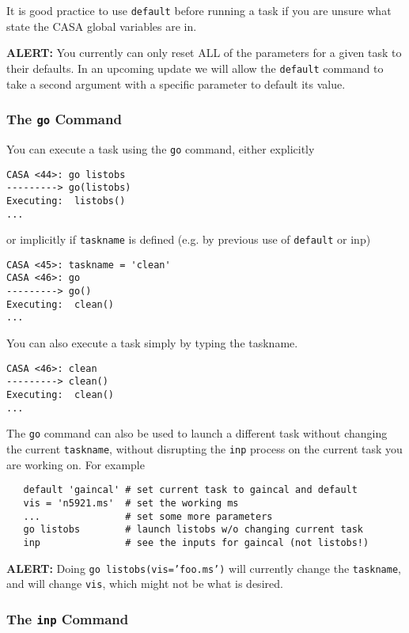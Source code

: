 It is good practice to use {\tt default} before running a task
if you are unsure what state the CASA global variables are in.

{\bf ALERT:} You currently can only reset ALL of the parameters
for a given task to their defaults.  In an upcoming update we will
allow the {\tt default} command to take a second argument with a
specific parameter to default its value.

\subsubsection{The {\tt go} Command}
\label{section:intro.tasks.setpar.go}

You can execute a task using the {\tt go} command, either explicitly
\small
\begin{verbatim}
CASA <44>: go listobs
---------> go(listobs)
Executing:  listobs()
...
\end{verbatim}
\normalsize
or implicitly
if {\tt taskname} is defined (e.g. by previous use of {\tt default}
or {inp})
\small
\begin{verbatim}
CASA <45>: taskname = 'clean'
CASA <46>: go
---------> go()
Executing:  clean()
...
\end{verbatim}
\normalsize

You can also execute a task simply by typing the taskname.
\small
\begin{verbatim}
CASA <46>: clean
---------> clean()
Executing:  clean()
...
\end{verbatim}
\normalsize

The {\tt go} command can also be used to launch a different task without
changing the current {\tt taskname}, without disrupting the 
{\tt inp} process on the current task you are working on.  For
example
\small
\begin{verbatim}
   default 'gaincal' # set current task to gaincal and default
   vis = 'n5921.ms'  # set the working ms
   ...               # set some more parameters
   go listobs        # launch listobs w/o changing current task
   inp               # see the inputs for gaincal (not listobs!)
\end{verbatim}
\normalsize
{\bf ALERT:} Doing {\tt go listobs(vis='foo.ms')} will currently
change the {\tt taskname}, and will change {\tt vis}, which might
not be what is desired.

\subsubsection{The {\tt inp} Command}
\label{section:intro.tasks.setpar.inp}

